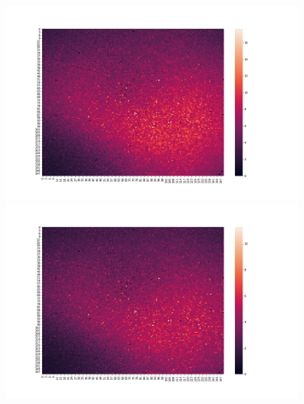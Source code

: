 \documentclass[a4paper]{article}
\begin{document}
\begin{figure}[ht]
  \centering
  \includegraphics[scale=0.14]{../gaussian_spread/gaussian_spread_6.png}
  \centering
  \includegraphics[scale=0.14]{../gaussian_spread/gaussian_spread_7.png}
  \centering
  \centering
\end{figure}
\end{document}

